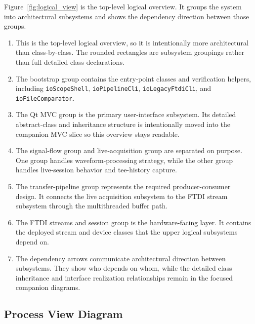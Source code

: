 
Figure~\ref{fig:logical_view} is the top-level logical overview. It groups the system into architectural subsystems and shows the dependency direction between those groups.

\begin{enumerate}
    \item This is the top-level logical overview, so it is intentionally more architectural than class-by-class. The rounded rectangles are subsystem groupings rather than full detailed class declarations.
    \item The bootstrap group contains the entry-point classes and verification helpers, including \texttt{ioScopeShell}, \texttt{ioPipelineCli}, \texttt{ioLegacyFtdiCli}, and \texttt{ioFileComparator}.
    \item The Qt MVC group is the primary user-interface subsystem. Its detailed abstract-class and inheritance structure is intentionally moved into the companion MVC slice so this overview stays readable.
    \item The signal-flow group and live-acquisition group are separated on purpose. One group handles waveform-processing strategy, while the other group handles live-session behavior and tee-history capture.
    \item The transfer-pipeline group represents the required producer-consumer design. It connects the live acquisition subsystem to the FTDI stream subsystem through the multithreaded buffer path.
    \item The FTDI streams and session group is the hardware-facing layer. It contains the deployed stream and device classes that the upper logical subsystems depend on.
    \item The dependency arrows communicate architectural direction between subsystems. They show who depends on whom, while the detailed class inheritance and interface realization relationships remain in the focused companion diagrams.
\end{enumerate}

\subsection{Process View Diagram}
\label{Section::Process View Diagram}


